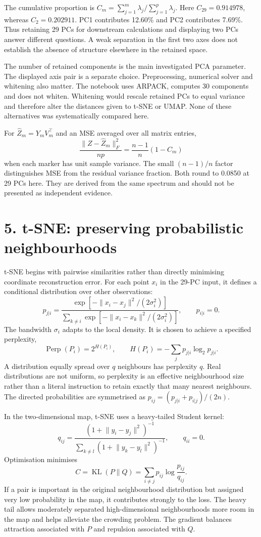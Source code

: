 \documentclass[11pt]{article}
\begin{document}
The cumulative proportion is $C_m=\sum_{j=1}^m\lambda_j/\sum_{j=1}^p\lambda_j$. Here $C_{29}=0.914978$, whereas $C_2=0.202911$. PC1 contributes 12.60\% and PC2 contributes 7.69\%. Thus retaining 29 PCs for downstream calculations and displaying two PCs answer different questions. A weak separation in the first two axes does not establish the absence of structure elsewhere in the retained space.

The number of retained components is the main investigated PCA parameter. The displayed axis pair is a separate choice. Preprocessing, numerical solver and whitening also matter. The notebook uses ARPACK, computes 30 components and does not whiten. Whitening would rescale retained PCs to equal variance and therefore alter the distances given to t-SNE or UMAP. None of these alternatives was systematically compared here.

For $\widehat Z_m=Y_mV_m^\top$ and an MSE averaged over all matrix entries,
\[
 \frac{\lVert Z-\widehat Z_m\rVert_F^2}{np}
 =\frac{n-1}{n}\left(1-C_m\right)
\]
when each marker has unit sample variance. The small $(n-1)/n$ factor distinguishes MSE from the residual variance fraction. Both round to 0.0850 at 29 PCs here. They are derived from the same spectrum and should not be presented as independent evidence.\cite{pcaapi}

\clearpage
\section*{5. t-SNE: preserving probabilistic neighbourhoods}
t-SNE begins with pairwise similarities rather than directly minimising coordinate reconstruction error. For each point $x_i$ in the 29-PC input, it defines a conditional distribution over other observations:
\[
 p_{j|i}=\frac{\exp[-\lVert x_i-x_j\rVert^2/(2\sigma_i^2)]}
 {\sum_{k\ne i}\exp[-\lVert x_i-x_k\rVert^2/(2\sigma_i^2)]},\qquad p_{i|i}=0.
\]
The bandwidth $\sigma_i$ adapts to the local density. It is chosen to achieve a specified perplexity,
\[
 \operatorname{Perp}(P_i)=2^{H(P_i)},\qquad
 H(P_i)=-\sum_jp_{j|i}\log_2p_{j|i}.
\]
A distribution equally spread over $q$ neighbours has perplexity $q$. Real distributions are not uniform, so perplexity is an effective neighbourhood size rather than a literal instruction to retain exactly that many nearest neighbours. The directed probabilities are symmetrised as $p_{ij}=(p_{j|i}+p_{i|j})/(2n)$.

In the two-dimensional map, t-SNE uses a heavy-tailed Student kernel:
\[
 q_{ij}=\frac{(1+\lVert y_i-y_j\rVert^2)^{-1}}
 {\sum_{k\ne l}(1+\lVert y_k-y_l\rVert^2)^{-1}},\qquad q_{ii}=0.
\]
Optimisation minimises
\[
 C=\operatorname{KL}(P\|Q)=\sum_{i\ne j}p_{ij}\log\frac{p_{ij}}{q_{ij}}.
\]
If a pair is important in the original neighbourhood distribution but assigned very low probability in the map, it contributes strongly to the loss. The heavy tail allows moderately separated high-dimensional neighbourhoods more room in the map and helps alleviate the crowding problem. The gradient balances attraction associated with $P$ and repulsion associated with $Q$.\cite{tsne}
\end{document}
